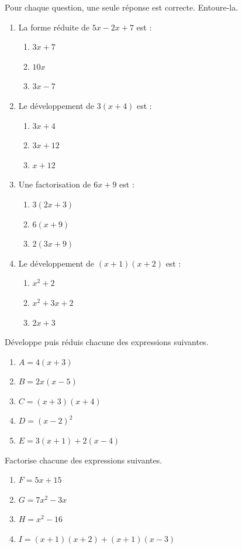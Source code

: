 \documentclass[11pt]{article}
\begin{document}
\begin{exercice}[QCM]
Pour chaque question, une seule réponse est correcte. Entoure-la.
\begin{enumerate}
\item La forme réduite de $5x - 2x + 7$ est :
\begin{enumerate}
\item $3x + 7$ \quad \item $10x$ \quad \item $3x - 7$
\end{enumerate}
\item Le développement de $3(x + 4)$ est :
\begin{enumerate}
\item $3x + 4$ \quad \item $3x + 12$ \quad \item $x + 12$
\end{enumerate}
\item Une factorisation de $6x + 9$ est :
\begin{enumerate}
\item $3(2x + 3)$ \quad \item $6(x + 9)$ \quad \item $2(3x + 9)$
\end{enumerate}
\item Le développement de $(x+1)(x+2)$ est :
\begin{enumerate}
\item $x^2 + 2$ \quad \item $x^2 + 3x + 2$ \quad \item $2x + 3$
\end{enumerate}
\end{enumerate}
\end{exercice}

\begin{exercice}
Développe puis réduis chacune des expressions suivantes.
\begin{enumerate}
\item $A = 4(x + 3)$
\item $B = 2x(x - 5)$
\item $C = (x + 3)(x + 4)$
\item $D = (x - 2)^2$
\item $E = 3(x + 1) + 2(x - 4)$
\end{enumerate}
\end{exercice}

\begin{exercice}[Factoriser]
Factorise chacune des expressions suivantes.
\begin{enumerate}
\item $F = 5x + 15$
\item $G = 7x^2 - 3x$
\item $H = x^2 - 16$
\item $I = (x+1)(x+2) + (x+1)(x-3)$
\end{enumerate}
\end{exercice}
\end{document}

